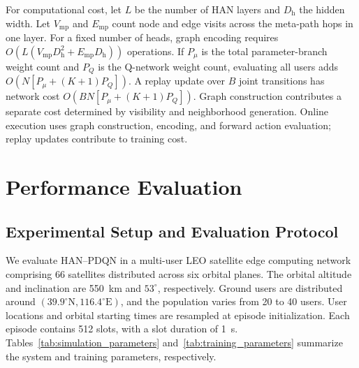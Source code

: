 \documentclass[journal]{IEEEtran}
\makeatletter
\newcommand{\LEOPageTopLayout}{%
  \setcounter{topnumber}{1}%
  \setcounter{dbltopnumber}{1}%
  \renewcommand{\topfraction}{0.92}%
  \renewcommand{\dbltopfraction}{0.80}%
  \renewcommand{\textfraction}{0.08}%
  \setlength{\textfloatsep}{10pt plus 2pt minus 2pt}%
  \setlength{\dbltextfloatsep}{10pt plus 2pt minus 2pt}%
  \setlength{\@fptop}{0pt}%
  \setlength{\@dblfptop}{0pt}%
}
\makeatother
\begin{document}
For computational cost, let $L$ be the number of HAN
layers and $D_{\mathrm h}$ the hidden width.
Let $V_{\mathrm{mp}}$ and $E_{\mathrm{mp}}$ count node
and edge visits across the meta-path hops in one layer.
For a fixed number of heads, graph encoding requires
$O(L(V_{\mathrm{mp}}D_{\mathrm h}^2+
E_{\mathrm{mp}}D_{\mathrm h}))$ operations.
If $P_\mu$ is the total parameter-branch weight count
and $P_Q$ is the Q-network weight count, evaluating all
users adds $O(N[P_\mu+(K+1)P_Q])$.
A replay update over $B$ joint transitions has network cost
$O(BN[P_\mu+(K+1)P_Q])$.
Graph construction contributes a separate cost determined
by visibility and neighborhood generation.
Online execution uses graph construction, encoding,
and forward action evaluation; replay updates contribute
to training cost.

\FloatBarrier
\LEOPageTopLayout
\section{Performance Evaluation}
\label{sec:performance_evaluation}

\subsection{Experimental Setup and Evaluation Protocol}
\label{subsec:experimental_setup}

We evaluate HAN--PDQN in a multi-user LEO satellite edge
computing network comprising 66 satellites distributed
across six orbital planes. The orbital altitude and
inclination are 550~km and $53^\circ$, respectively.
Ground users are distributed around
$(39.9^\circ\mathrm{N},116.4^\circ\mathrm{E})$, and the
population varies from 20 to 40 users.
User locations and orbital starting times are resampled
at episode initialization. Each episode contains
512 slots, with a slot duration of 1~s.
Tables~\ref{tab:simulation_parameters} and~\ref{tab:training_parameters}
summarize the system and training parameters, respectively.
\end{document}
